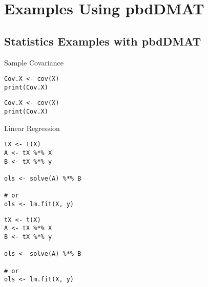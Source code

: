 




\section[pbdDMAT eg's]{Examples Using pbdDMAT}
\setcounter{excount}{0}



\subsection{Statistics Examples with pbdDMAT}

\begin{frame}[fragile]
  \begin{exampleblock}{Sample Covariance}\pause
\begin{lstlisting}[title=Serial Code]
Cov.X <- cov(X)
print(Cov.X)
\end{lstlisting}

\begin{lstlisting}[title=Parallel Code]
Cov.X <- cov(X)
print(Cov.X)
\end{lstlisting}
  \end{exampleblock}
\end{frame}

\begin{frame}
  \begin{exampleblock}{Linear Regression}\pause
\begin{lstlisting}[title=Serial Code]
tX <- t(X)
A <- tX %*% X
B <- tX %*% y

ols <- solve(A) %*% B

# or
ols <- lm.fit(X, y)
\end{lstlisting}
  
\begin{lstlisting}[title=Parallel Code]
tX <- t(X)
A <- tX %*% X
B <- tX %*% y

ols <- solve(A) %*% B

# or
ols <- lm.fit(X, y)
\end{lstlisting}
  \end{exampleblock}
\end{frame}



